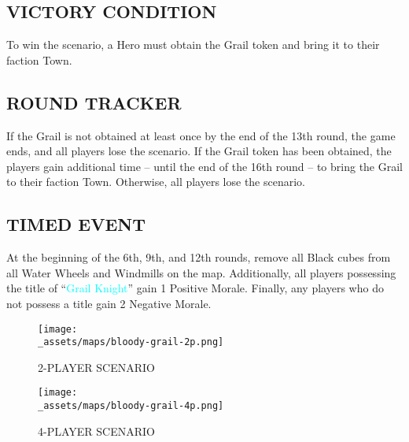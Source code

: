 \begin{multicols*}{2}
\subsection*{\MakeUppercase{Victory Condition}}
To win the scenario, a Hero must obtain the Grail token and bring it to their faction Town.
\subsection*{\MakeUppercase{Round Tracker}}
If the Grail is not obtained at least once by the end of the 13th round, the game ends, and all players lose the scenario.
If the Grail token has been obtained, the players gain additional time – until the end of the 16th round – to bring the Grail to their faction Town. Otherwise, all players lose the scenario.
\subsection*{\MakeUppercase{Timed Event}}
At the beginning of the 6th, 9th, and 12th rounds, remove all Black cubes from all Water Wheels and Windmills on the map. Additionally, all players possessing the title of “\textcolor{cyan}{Grail Knight}” gain 1 Positive Morale. Finally, any players who do not possess a title gain 2 Negative Morale.
\end{multicols*}
\begin{figure}
    \texttt{[image: \\\_assets/maps/bloody-grail-2p.png]}
    \caption{2-PLAYER SCENARIO}
\end{figure}
\begin{figure}
    \texttt{[image: \\\_assets/maps/bloody-grail-4p.png]}
    \caption{4-PLAYER SCENARIO}
\end{figure}
